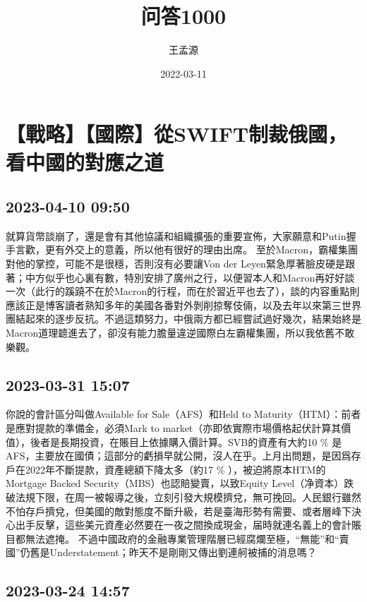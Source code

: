 \documentclass[twocolumn]{ctexart}
\begin{document}
\title{问答1000}
\author{王孟源}
\date{2022-03-11}

\twocolumn[
\begin{@twocolumnfalse}
\maketitle %
\end{@twocolumnfalse}
]
\section*{【戰略】【國際】從SWIFT制裁俄國，看中國的對應之道}
\subsection*{2023-04-10 09:50}

就算貨幣談崩了，還是會有其他協議和組織擴張的重要宣佈，大家願意和Putin握手言歡，更有外交上的意義，所以他有很好的理由出席。
至於Macron，霸權集團對他的掌控，可能不是很穩，否則沒有必要讓Von der Leyen緊急厚著臉皮硬是跟著；中方似乎也心裏有數，特別安排了廣州之行，以便習本人和Macron再好好談一次（此行的蹊蹺不在於Macron的行程，而在於習近平也去了），談的内容重點則應該正是博客讀者熟知多年的美國各番對外剝削掠奪伎倆，以及去年以來第三世界團結起來的逐步反抗。不過這類努力，中俄兩方都已經嘗試過好幾次，結果始終是Macron道理聼進去了，卻沒有能力膽量違逆國際白左霸權集團，所以我依舊不敢樂觀。
\subsection*{2023-03-31 15:07}

你說的會計區分叫做Available for Sale（AFS）和Held to Maturity（HTM）：前者是應對提款的準備金，必須Mark to market（亦即依實際市場價格起伏計算其價值），後者是長期投資，在賬目上依據購入價計算。SVB的資產有大約10 \% 是AFS，主要放在國債；這部分的虧損早就公開，沒人在乎。上月出問題，是因爲存戶在2022年不斷提款，資產總額下降太多（約17 \% ），被迫將原本HTM的Mortgage Backed Security（MBS）也認賠變賣，以致Equity Level（净資本）跌破法規下限，在周一被報導之後，立刻引發大規模擠兌，無可挽回。人民銀行雖然不怕存戶擠兌，但美國的敵對態度不斷升級，若是臺海形勢有需要、或者層峰下決心出手反擊，這些美元資產必然要在一夜之間換成現金，届時就連名義上的會計賬目都無法遮掩。
不過中國政府的金融專業管理階層已經腐爛至極，“無能”和“賣國”仍舊是Understatement；昨天不是剛剛又傳出劉連舸被捕的消息嗎？
\subsection*{2023-03-24 14:57}
\end{document}
